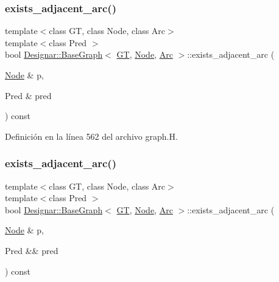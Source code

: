 \subsubsection{\texorpdfstring{exists\+\_\+adjacent\+\_\+arc()}{exists\_adjacent\_arc()}\hspace{0.1cm}{\footnotesize\ttfamily [1/2]}}
{\footnotesize\ttfamily template$<$class GT, class Node, class Arc$>$ \\
template$<$class Pred $>$ \\
bool \hyperlink{class_designar_1_1_base_graph}{Designar\+::\+Base\+Graph}$<$ \hyperlink{demo-buildgraph_8_c_a3001c40d2c31ca87ed96cd7d1334a55e}{GT}, \hyperlink{namespace_designar_a5af326c65aa2bd26b26c410f2030d09e}{Node}, \hyperlink{namespace_designar_a3f55fb5513d62ff47cbc8f72b8e95d6f}{Arc} $>$\+::exists\+\_\+adjacent\+\_\+arc (\begin{DoxyParamCaption}\item[{\hyperlink{namespace_designar_a5af326c65aa2bd26b26c410f2030d09e}{Node} \&}]{p,  }\item[{Pred \&}]{pred }\end{DoxyParamCaption}) const\hspace{0.3cm}{\ttfamily [inline]}}



Definición en la línea 562 del archivo graph.\+H.

\mbox{\label{class_designar_1_1_base_graph_a16d3fbb089265c1dc8da8ffbe2fb1434}} 
\subsubsection{\texorpdfstring{exists\+\_\+adjacent\+\_\+arc()}{exists\_adjacent\_arc()}\hspace{0.1cm}{\footnotesize\ttfamily [2/2]}}
{\footnotesize\ttfamily template$<$class GT, class Node, class Arc$>$ \\
template$<$class Pred $>$ \\
bool \hyperlink{class_designar_1_1_base_graph}{Designar\+::\+Base\+Graph}$<$ \hyperlink{demo-buildgraph_8_c_a3001c40d2c31ca87ed96cd7d1334a55e}{GT}, \hyperlink{namespace_designar_a5af326c65aa2bd26b26c410f2030d09e}{Node}, \hyperlink{namespace_designar_a3f55fb5513d62ff47cbc8f72b8e95d6f}{Arc} $>$\+::exists\+\_\+adjacent\+\_\+arc (\begin{DoxyParamCaption}\item[{\hyperlink{namespace_designar_a5af326c65aa2bd26b26c410f2030d09e}{Node} \&}]{p,  }\item[{Pred \&\&}]{pred }\end{DoxyParamCaption}) const\hspace{0.3cm}{\ttfamily [inline]}}



